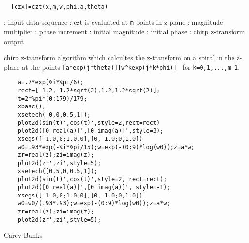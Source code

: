 
\begin{mandesc}
   \\ %
\end{mandesc}
\begin{calling_sequence}
\begin{verbatim}
  [czx]=czt(x,m,w,phi,a,theta)  
\end{verbatim}
\end{calling_sequence}
\begin{parameters}
  \begin{varlist}
    : input data sequence
    : czt is evaluated at \verb!m! points in z-plane
    : magnitude multiplier
    : phase increment
    : initial magnitude
    : initial phase
    : chirp z-transform output
  \end{varlist}
\end{parameters}
\begin{mandescription}
  chirp z-transform algorithm which calcultes the z-transform on a
  spiral in the z-plane at the points
  \verb![a*exp(j*theta)][w^kexp(j*k*phi)] ! for
  \verb!k=0,1,...,m-1!.
\end{mandescription}
\begin{examples}
  \begin{Verbatim}
    a=.7*exp(%i*%pi/6);
    rect=[-1.2,-1.2*sqrt(2),1.2,1.2*sqrt(2)];
    t=2*%pi*(0:179)/179;
    xbasc();
    xsetech([0,0,0.5,1]);
    plot2d(sin(t)',cos(t)',style=2,rect=rect)
    plot2d([0 real(a)]',[0 imag(a)]',style=3);
    xsegs([-1.0,0;1.0,0],[0,-1.0;0,1.0])
    w0=.93*exp(-%i*%pi/15);w=exp(-(0:9)*log(w0));z=a*w;
    zr=real(z);zi=imag(z);
    plot2d(zr',zi',style=5);
    xsetech([0.5,0,0.5,1]);
    plot2d(sin(t)',cos(t)',style=2, rect=rect);
    plot2d([0 real(a)]',[0 imag(a)]', style=-1);
    xsegs([-1.0,0;1.0,0],[0,-1.0;0,1.0])
    w0=w0/(.93*.93);w=exp(-(0:9)*log(w0));z=a*w;
    zr=real(z);zi=imag(z);
    plot2d(zr',zi',style=5);
  \end{Verbatim}
\end{examples}
\begin{authors}
  Carey Bunks
\end{authors}
